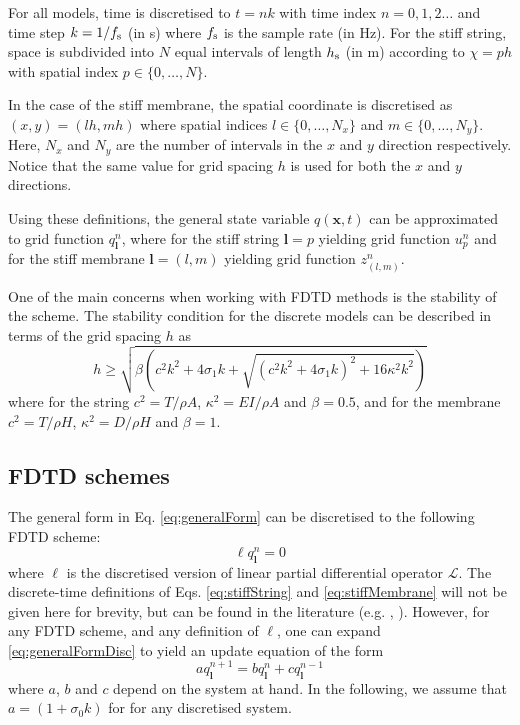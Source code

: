 \documentclass{article}
\begin{document}
For all models, time is discretised to $t = nk$ with time index $n = 0, 1, 2 \hdots$ and time step $k = 1/f_\text{s}$ (in s) where $f_\text{s}$ is the sample rate (in Hz). For the stiff string, space is subdivided into $N$ equal intervals of length $h_{\text{s}}$ (in m) according to $\chi = p h$ with spatial index $p \in \{0, \hdots, N\}$. 

In the case of the stiff membrane, the spatial coordinate is discretised as $(x, y) = (l h, m h)$ where spatial indices $l \in \{0, \hdots, N_x\}$ and $m\in\{0, \hdots, N_y\}$. Here, $N_x$ and $N_y$ are the number of intervals in the $x$ and $y$ direction respectively. Notice that the same value for grid spacing $h$ is used for both the $x$ and $y$ directions. 

Using these definitions, the general state variable $q(\boldsymbol{x}, t)$ can be approximated to grid function $q_{\boldsymbol{l}}^n$, where for the stiff string $\boldsymbol{l} = p$ yielding grid function $u_p^n$ and for the stiff membrane $\boldsymbol{l} = (l, m)$ yielding grid function $z_{(l,m)}^n$.

One of the main concerns when working with FDTD methods is the stability of the scheme. The stability condition for the discrete models can be described in terms of the grid spacing $h$ as \cite{WillemsenThesis}
\begin{equation}
    h\geq \sqrt{\beta\left(c^2k^2 + 4 \sigma_1k+\sqrt{(c^2k^2 + 4 \sigma_1k)^2 + 16 \kappa^2k^2}\right)}
\end{equation}
where for the string $c^2 = T/\rho A$, $\kappa^2 = EI/\rho A$ and $\beta = 0.5$, and for the membrane $c^2 = T / \rho H$, $\kappa^2 = D/\rho H$ and $\beta = 1$. 


\subsection{FDTD schemes}
The general form in Eq. \eqref{eq:generalForm} can be discretised to the following FDTD scheme:
\begin{equation}\label{eq:generalFormDisc}
    \ell q_{\boldsymbol{l}}^n = 0
\end{equation}
where $\ell$ is the discretised version of linear partial differential operator $\mathcal{L}$. The discrete-time definitions of Eqs. \eqref{eq:stiffString} and \eqref{eq:stiffMembrane} will not be given here for brevity, but can be found in the literature (e.g. \cite{theBible}, \cite{WillemsenThesis}). However, for any FDTD scheme, and any definition of $\ell$, one can expand \eqref{eq:generalFormDisc} to yield an update equation of the form
\begin{equation}\label{eq:generalUpdate}
    a q_{\boldsymbol{l}}^{n+1} = b q_{\boldsymbol{l}}^n + c q_{\boldsymbol{l}}^{n-1}
\end{equation}
where $a$, $b$ and $c$ depend on the system at hand. In the following, we assume that $a = (1+\sigma_0 k)$ for for any discretised system.
\end{document}
